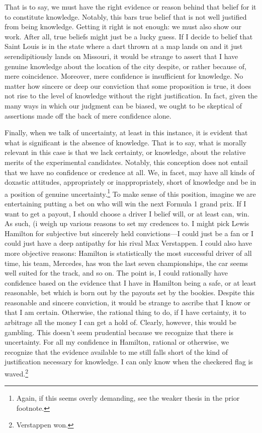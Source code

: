 \documentclass[letterpaper,notitlepage,12pt]{article}
\begin{document}
That is to say, we must have the right evidence or reason behind that belief for
it to constitute knowledge.
Notably, this bars true belief that is not well justified from being knowledge.
Getting it right is not enough: we must also show our work.
After all, true beliefs might just be a lucky guess.
If I decide to belief that Saint Louis is in the state where a dart thrown at a
map lands on and it just serendipitiously lands on Missouri, it would be strange
to assert that I have genuine knowledge about the location of the city despite,
or rather because of, mere coincidence.
Moreover, mere confidence is insufficient for knowledge.
No matter how sincere or deep our conviction that some proposition is true, it
does not rise to the level of knowledge without the right justification.
In fact, given the many ways in which our judgment can be biased, we ought to
be skeptical of assertions made off the back of mere confidence alone.

Finally, when we talk of uncertainty, at least in this instance, it is evident
that what is significant is the absence of knowledge.
That is to say, what is morally relevant in this case is that we lack certainty,
or knowledge, about the relative merits of the experimental candidates.
Notably, this conception does not entail that we have no confidence or credence
at all.
We, in facet, may have all kinds of doxastic attitudes, appropriately or
inappropriately, short of knowledge and be in a position of genuine
uncertainty.\footnote{Again, if this seems overly demanding, see the weaker
thesis in the prior footnote.}
To make sense of this position, imagine we are entertaining putting a bet on who
will win the next Formula 1 grand prix.
If I want to get a payout, I should choose a driver I belief will, or at least
can, win.
As such, (i weigh up various reasons to set my credences to.
I might pick Lewis Hamilton for subjective but sincerely held convictions---I
could just be a fan or I could just have a deep antipathy for his rival Max
Verstappen.
I could also have more objective reasons: Hamilton is statistically the most
successful driver of all time, his team, Mercedes, has won the last seven
championships, the car seems well suited for the track, and so on.
The point is, I could rationally have confidence based on the evidence that I
have in Hamilton being a safe, or at least reasonable, bet which is born out by
the payouts set by the bookies.
Despite this reasonable and sincere conviction, it would be strange to ascribe
that I know or that I am certain. 
Otherwise, the rational thing to do, if I have certainty, it to arbitrage all
the money I can get a hold of.
Clearly, however, this would be gambling.
This doesn't seem prudential because we recognize that there is uncertainty.
For all my confidence in Hamilton, rational or otherwise, we recognize that the
evidence available to me still falls short of the kind of justification
necessary for knowledge.
I can only know when the checkered flag is waved.\footnote{Verstappen won.}
\end{document}
